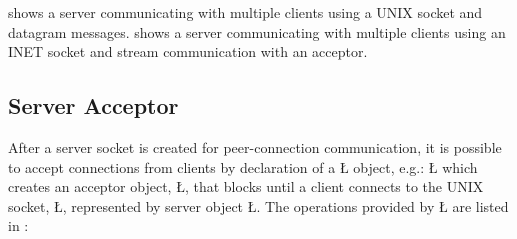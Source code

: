 \documentclass[openright,twoside]{report}
\begin{document}
 shows a server communicating with multiple clients using a UNIX socket and datagram messages.
 shows a server communicating with multiple clients using an INET socket and stream communication with an acceptor.


\subsection{Server Acceptor}

After a server socket is created for peer-connection communication, it is possible to accept connections from clients by declaration of a \LGinlinetrue\LGbegin\lgrinde\L{}\endlgrinde\LGend{} object, e.g.:
\LGinlinefalse\LGbegin\lgrinde
\L{}
\endlgrinde\LGend
which creates an acceptor object, \LGinlinetrue\LGbegin\lgrinde\L{}\endlgrinde\LGend{}, that blocks until a client connects to the UNIX socket, \LGinlinetrue\LGbegin\lgrinde\L{}\endlgrinde\LGend{}, represented by server object \LGinlinetrue\LGbegin\lgrinde\L{}\endlgrinde\LGend{}.
The operations provided by \LGinlinetrue\LGbegin\lgrinde\L{}\endlgrinde\LGend{} are listed in :
\end{document}
